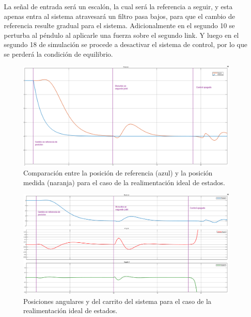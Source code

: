 %
%
%
La señal de entrada será un escalón, la cual será la referencia a seguir, y esta apenas entra al sistema atravesará un filtro pasa bajos, para que el cambio de referencia resulte gradual para el sistema.
Adicionalmente en el segundo 10 se perturba al péndulo al aplicarle una fuerza sobre el segundo link. Y luego en el segundo 18 de simulación se procede a desactivar el sistema de control, por lo que se perderá la condición de equilibrio.

\begin{figure}[H]
	\centering
	\includegraphics[width=\linewidth]{../Analisis de Resultados/ImagenesAnalisis de Resultados/realim_posref.png}
	\caption{Comparación entre la posición de referencia (azul) y la posición medida (naranja) para el caso de la realimentación ideal de estados.}	
	\label{fig:realim_posref}
\end{figure}

\begin{figure}[H]
	\centering
	\includegraphics[width=\linewidth]{../Analisis de Resultados/ImagenesAnalisis de Resultados/realim_vars.png}
	\caption{Posiciones angulares y del carrito del sistema para el caso de la realimentación ideal de estados.}	
	\label{fig:realim_vars}
\end{figure}

